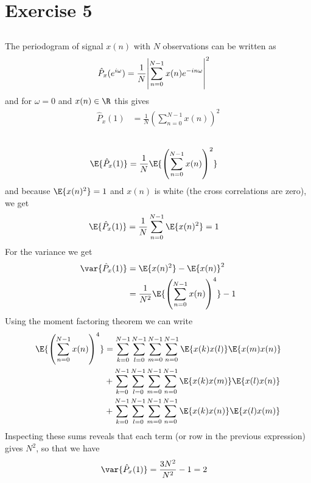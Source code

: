\section*{Exercise 5}
\subsection{}
The periodogram of signal $x(n)$ with $N$ observations can be written
as
\begin{align}
	\hat{P}_x(e^{i\omega})&=\frac{1}{N}\abs{\sum_{n=0}^{N-1}x(n)e^{-in\omega}}^2
\end{align}
and for $\omega=0$ and $x(n)\in\R$ this gives
\begin{align}
	\hat{P}_x(1)&=\frac{1}{N}\left(\sum_{n=0}^{N-1}x(n)\right)^2
\end{align}


\subsection{}

\begin{align}
	\E{\hat{P}_x(1)}&=\frac{1}{N}\E{\left(\sum_{n=0}^{N-1}x(n)\right)^2}
\end{align}
and because $\E{x(n)^2}=1$ and $x(n)$ is white (the cross correlations are
zero), we get
\begin{align}
	\E{\hat{P}_x(1)}&=\frac{1}{N}\sum_{n=0}^{N-1}\E{x(n)^2}=1
\end{align}
For the variance we get
\begin{align}
	\var{\hat{P}_x(1)}&=\E{x(n)^2}-\E{x(n)}^2\\
	&=\frac{1}{N^2}\E{\left(\sum_{n=0}^{N-1}x(n)\right)^4}-1
\end{align}
Using the moment factoring theorem we can write
\begin{align}
	\E{\left(\sum_{n=0}^{N-1}x(n)\right)^4}&=\sum_{k=0}^{N-1}\sum_{l=0}^{N-1}\sum_{m=0}^{N-1}\sum_{n=0}^{N-1}\E{x(k)x(l)}\E{x(m)x(n)}\\
	&+\sum_{k=0}^{N-1}\sum_{l=0}^{N-1}\sum_{m=0}^{N-1}\sum_{n=0}^{N-1}\E{x(k)x(m)}\E{x(l)x(n)}\\
	&+\sum_{k=0}^{N-1}\sum_{l=0}^{N-1}\sum_{m=0}^{N-1}\sum_{n=0}^{N-1}\E{x(k)x(n)}\E{x(l)x(m)}
\end{align}
Inspecting these sums reveals that each term (or row in the previous expression)
gives $N^2$, so that we have
\begin{align}
	\var{\hat{P}_x(1)}&=\frac{3N^2}{N^2}-1=2
\end{align}


